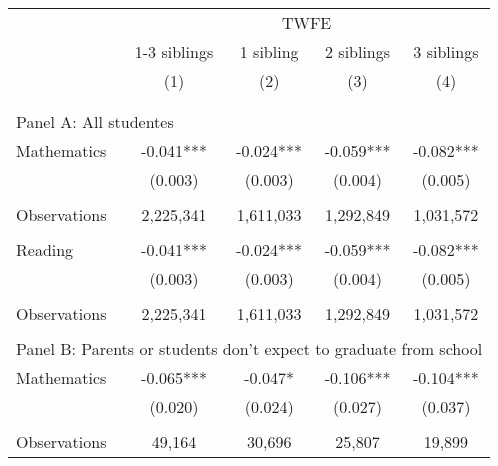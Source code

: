 \makeatletter
{}
{
\makeatother
\begin{tabular}{lcccc}
\toprule
\cmidrule(lr){2-5}
& \multicolumn{4}{c}{TWFE} \\
\cmidrule(lr){2-5}
& 1-3 siblings & 1 sibling & 2 siblings & 3 siblings  \\
\cmidrule(lr){2-2} \cmidrule(lr){3-3} \cmidrule(lr){4-4} \cmidrule(lr){5-5}
& (1) & (2) & (3) & (4) \\
\bottomrule
&  &  & &  \\
&  &  & &  \\
\multicolumn{5}{l}{Panel A: All studentes } \\
Mathematics         &      -0.041***&      -0.024***&      -0.059***&      -0.082***\\
                    &     (0.003)   &     (0.003)   &     (0.004)   &     (0.005)   \\
                    &               &               &               &               \\
Observations        &   2,225,341   &   1,611,033   &   1,292,849   &   1,031,572   \\
 
&  &  & &  \\
Reading             &      -0.041***&      -0.024***&      -0.059***&      -0.082***\\
                    &     (0.003)   &     (0.003)   &     (0.004)   &     (0.005)   \\
                    &               &               &               &               \\
Observations        &   2,225,341   &   1,611,033   &   1,292,849   &   1,031,572   \\
 
&  &  & &  \\
\multicolumn{5}{l}{Panel B: Parents or students don't expect to graduate from school} \\
Mathematics         &      -0.065***&      -0.047*  &      -0.106***&      -0.104***\\
                    &     (0.020)   &     (0.024)   &     (0.027)   &     (0.037)   \\
                    &               &               &               &               \\
Observations        &      49,164   &      30,696   &      25,807   &      19,899   \\
 

\end{tabular}}
